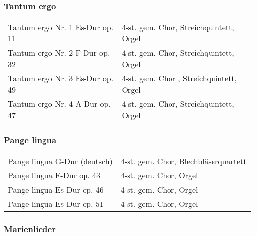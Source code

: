 \documentclass{book}
\begin{document}
\subsubsection{Tantum ergo}

\begin{tabular}{ll}
Tantum ergo Nr. 1 Es-Dur op. 11 &
4-st. gem. Chor, Streichquintett, Orgel\\

Tantum ergo Nr. 2 F-Dur op. 32 &
4-st. gem. Chor, Streichquintett, Orgel\\

Tantum ergo Nr. 3 Es-Dur op. 49 &
4-st. gem. Chor , Streichquintett, Orgel\\

Tantum ergo Nr. 4 A-Dur op. 47 &
4-st. gem. Chor, Streichquintett, Orgel\\
\end{tabular}

\subsubsection{Pange lingua}

\begin{tabular}{ll}
Pange lingua G-Dur (deutsch) &
4-st. gem. Chor, Blechbläserquartett\\

Pange lingua F-Dur op. 43 &
4-st. gem. Chor, Orgel\\

Pange lingua Es-Dur op. 46 &
4-st. gem. Chor, Orgel\\

Pange lingua Es-Dur op. 51 &
4-st. gem. Chor, Orgel\\
\end{tabular}

\subsubsection{Marienlieder}
\end{document}
